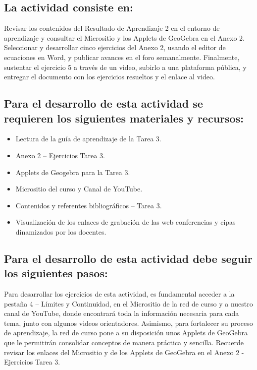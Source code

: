 \documentclass[12pt,letterpaper]{article}
\begin{document}
\subsection*{La actividad consiste en:}

Revisar los contenidos del Resultado de Aprendizaje 2 en el entorno de aprendizaje y consultar el Micrositio y los Applets de GeoGebra en el Anexo 2. Seleccionar y desarrollar cinco ejercicios del Anexo 2, usando el editor de ecuaciones en Word, y publicar avances en el foro semanalmente. Finalmente, sustentar el ejercicio 5 a través de un video, subirlo a una plataforma pública, y entregar el documento con los ejercicios resueltos y el enlace al video.

\subsection*{Para el desarrollo de esta actividad se requieren los siguientes materiales y recursos:}

\begin{itemize}
\item Lectura de la guía de aprendizaje de la Tarea 3.
\item Anexo 2 -- Ejercicios Tarea 3.
\item Applets de Geogebra para la Tarea 3.
\item Micrositio del curso y Canal de YouTube.
\item Contenidos y referentes bibliográficos -- Tarea 3.
\item Visualización de los enlaces de grabación de las web conferencias y cipas dinamizados por los docentes.
\end{itemize}

\subsection*{Para el desarrollo de esta actividad debe seguir los siguientes pasos:}

Para desarrollar los ejercicios de esta actividad, es fundamental acceder a la pestaña 4 -- Límites y Continuidad, en el Micrositio de la red de curso y a nuestro canal de YouTube, donde encontrará toda la información necesaria para cada tema, junto con algunos videos orientadores. Asimismo, para fortalecer su proceso de aprendizaje, la red de curso pone a su disposición unos Applets de GeoGebra que le permitirán consolidar conceptos de manera práctica y sencilla. Recuerde revisar los enlaces del Micrositio y de los Applets de GeoGebra en el Anexo 2 - Ejercicios Tarea 3.
\end{document}
